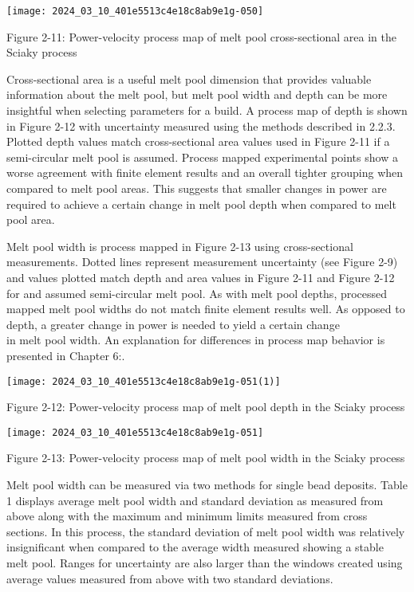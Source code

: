 \documentclass[10pt]{article}
\begin{document}
\begin{center}
\texttt{[image: 2024\_03\_10\_401e5513c4e18c8ab9e1g-050]}
\end{center}

Figure 2-11: Power-velocity process map of melt pool cross-sectional area in the Sciaky process

Cross-sectional area is a useful melt pool dimension that provides valuable information about the melt pool, but melt pool width and depth can be more insightful when selecting parameters for a build. A process map of depth is shown in Figure 2-12 with uncertainty measured using the methods described in 2.2.3. Plotted depth values match cross-sectional area values used in Figure 2-11 if a semi-circular melt pool is assumed. Process mapped experimental points show a worse agreement with finite element results and an overall tighter grouping when compared to melt pool areas. This suggests that smaller changes in power are required to achieve a certain change in melt pool depth when compared to melt pool area.

Melt pool width is process mapped in Figure 2-13 using cross-sectional measurements. Dotted lines represent measurement uncertainty (see Figure 2-9) and values plotted match depth and area values in Figure 2-11 and Figure 2-12 for and assumed semi-circular melt pool. As with melt pool depths, processed mapped melt pool widths do not match finite element results well. As opposed to depth, a greater change in power is needed to yield a certain change\\
in melt pool width. An explanation for differences in process map behavior is presented in Chapter 6:.

\begin{center}
\texttt{[image: 2024\_03\_10\_401e5513c4e18c8ab9e1g-051(1)]}
\end{center}

Figure 2-12: Power-velocity process map of melt pool depth in the Sciaky process

\begin{center}
\texttt{[image: 2024\_03\_10\_401e5513c4e18c8ab9e1g-051]}
\end{center}

Figure 2-13: Power-velocity process map of melt pool width in the Sciaky process

Melt pool width can be measured via two methods for single bead deposits. Table 1 displays average melt pool width and standard deviation as measured from above along with the maximum and minimum limits measured from cross sections. In this process, the standard deviation of melt pool width was relatively insignificant when compared to the average width measured showing a stable melt pool. Ranges for uncertainty are also larger than the windows created using average values measured from above with two standard deviations.
\end{document}
